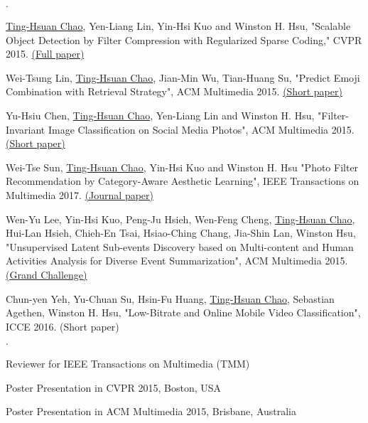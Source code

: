 \documentclass{joel_cv}
\begin{document}
\begin{sectionItemize}{$\cdot$}
	\item \underline{Ting-Hsuan Chao}, Yen-Liang Lin, Yin-Hsi Kuo and Winston H. Hsu, "Scalable Object Detection by Filter Compression with Regularized Sparse Coding," CVPR 2015. \href{http://www.cv-foundation.org/openaccess/content_cvpr_2015/html/Chao_Scalable_Object_Detection_2015_CVPR_paper.html}{(Full paper)}

	\item Wei-Tsung Lin, \underline{Ting-Hsuan Chao}, Jian-Min Wu, Tian-Huang Su, "Predict Emoji Combination with Retrieval Strategy", ACM Multimedia 2015. \href{https://www.anlp.jp/proceedings/annual_meeting/2019/pdf_dir/B2-5.pdf}{(Short paper)}
	
	\item Yu-Hsiu Chen, \underline{Ting-Hsuan Chao}, Yen-Liang Lin and Winston H. Hsu, "Filter-Invariant Image Classification on Social Media Photos", ACM Multimedia 2015. \href{http://dl.acm.org/citation.cfm?id=2806348}{(Short paper)}
	
	\item Wei-Tse Sun, \underline{Ting-Hsuan Chao}, Yin-Hsi Kuo and Winston H. Hsu "Photo Filter Recommendation by Category-Aware Aesthetic Learning", IEEE Transactions on Multimedia 2017. \href{http://joelthchao.github.io/pdf/photo_sun_tmm_2017.pdf}{(Journal paper)}
	
	\item Wen-Yu Lee, Yin-Hsi Kuo, Peng-Ju Hsieh, Wen-Feng Cheng, \underline{Ting-Hsuan Chao}, Hui-Lan Hsieh, Chieh-En Tsai, Hsiao-Ching Chang, Jia-Shin Lan, Winston Hsu, "Unsupervised Latent Sub-events Discovery based on Multi-content and Human Activities Analysis for Diverse Event Summarization", ACM Multimedia 2015. \href{http://dl.acm.org/citation.cfm?id=2809935}{(Grand Challenge)}
	
	\item Chun-yen Yeh, Yu-Chuan Su, Hsin-Fu Huang, \underline{Ting-Hsuan Chao}, Sebastian Agethen, Winston H. Hsu, "Low-Bitrate and Online Mobile Video Classification", ICCE 2016. (Short paper)
\end{sectionItemize}

%
%

\begin{sectionItemize}{$\cdot$}
	\item Reviewer for IEEE Transactions on Multimedia (TMM)
	\item Poster Presentation in CVPR 2015, Boston, USA
	\item Poster Presentation in ACM Multimedia 2015, Brisbane, Australia
\end{sectionItemize}
\end{document}
